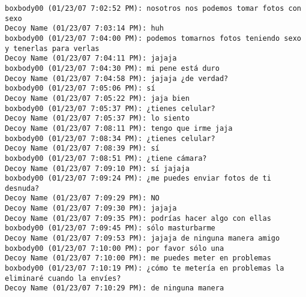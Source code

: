 \begin{verbatim}
boxbody00 (01/23/07 7:02:52 PM): nosotros nos podemos tomar fotos con sexo
Decoy Name (01/23/07 7:03:14 PM): huh
boxbody00 (01/23/07 7:04:00 PM): podemos tomarnos fotos teniendo sexo y tenerlas para verlas
Decoy Name (01/23/07 7:04:11 PM): jajaja
boxbody00 (01/23/07 7:04:30 PM): mi pene está duro
Decoy Name (01/23/07 7:04:58 PM): jajaja ¿de verdad?
boxbody00 (01/23/07 7:05:06 PM): sí
Decoy Name (01/23/07 7:05:22 PM): jaja bien
boxbody00 (01/23/07 7:05:37 PM): ¿tienes celular?
Decoy Name (01/23/07 7:05:37 PM): lo siento
Decoy Name (01/23/07 7:08:11 PM): tengo que irme jaja
boxbody00 (01/23/07 7:08:34 PM): ¿tienes celular?
Decoy Name (01/23/07 7:08:39 PM): sí
boxbody00 (01/23/07 7:08:51 PM): ¿tiene cámara?
Decoy Name (01/23/07 7:09:10 PM): sí jajaja
boxbody00 (01/23/07 7:09:24 PM): ¿me puedes enviar fotos de ti desnuda?
Decoy Name (01/23/07 7:09:29 PM): NO
Decoy Name (01/23/07 7:09:30 PM): jajaja
Decoy Name (01/23/07 7:09:35 PM): podrías hacer algo con ellas
boxbody00 (01/23/07 7:09:45 PM): sólo masturbarme
Decoy Name (01/23/07 7:09:53 PM): jajaja de ninguna manera amigo
boxbody00 (01/23/07 7:10:00 PM): por favor sólo una
Decoy Name (01/23/07 7:10:00 PM): me puedes meter en problemas
boxbody00 (01/23/07 7:10:19 PM): ¿cómo te metería en problemas la eliminaré cuando la envíes?
Decoy Name (01/23/07 7:10:29 PM): de ninguna manera

\end{verbatim}
